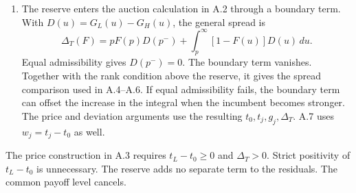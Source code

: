 \begin{enumerate}
\item
The reserve enters the auction calculation in A.2 through a boundary term.
With \(D(u)=G_L(u)-G_H(u)\), the general spread is
\[
\Delta_T(F)=pF(p)D(p^-)+\int_p^\infty[1-F(u)]D(u)\,du.
\]
Equal admissibility gives \(D(p^-)=0\).
The boundary term vanishes.
Together with the rank condition above the reserve, it gives the spread comparison used in A.4--A.6.
If equal admissibility fails, the boundary term can offset the increase in the integral when the incumbent becomes stronger.
The price and deviation arguments use the resulting \(t_0,t_j,g_j,\Delta_T\).
A.7 uses \(w_j=t_j-t_0\) as well.
\end{enumerate}

The price construction in A.3 requires \(t_L-t_0\ge0\) and \(\Delta_T>0\).
Strict positivity of \(t_L-t_0\) is unnecessary.
The reserve adds no separate term to the residuals.
The common payoff level cancels.
